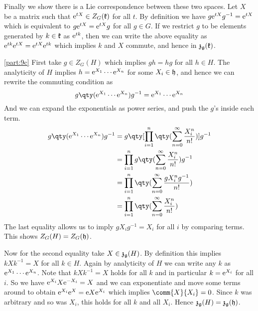 \documentclass[
	pages,
	boxes,
	color=WildStrawberry
]{homework}
\begin{document}
\begin{solution}
	Finally we show there is a Lie correspondence between these two spaces. Let $X$ be a matrix such that $\mathrm{e}^{tX}\in Z_G(\mathfrak{k})$ for all $t$. By definition we have $g\mathrm{e}^{tX}g^{-1} = \mathrm{e}^{tX}$ which is equivalent to $g\mathrm{e}^{tX} = \mathrm{e}^{tX}g$ for all $g\in G$. If we restrict $g$ to be elements generated by $k\in \mathfrak{k}$ as $\mathrm{e}^{tk}$, then we can write the above equality as $\mathrm{e}^{tk}\mathrm{e}^{tX} = \mathrm{e}^{tX}\mathrm{e}^{tk}$ which implies $k$ and $X$ commute, and hence in $\mathfrak{z}_{\mathfrak{g}}(\mathfrak{k})$.

	\ref{part:9c}
	First take $g\in Z_G(H)$ which implies $gh = hg$ for all $h\in H$. The analyticity of $H$ implies $h = \mathrm{e}^{X_1}\cdots \mathrm{e}^{X_n}$ for some $X_i\in\mathfrak{h}$, and hence we can rewrite the commuting condition as
	\begin{equation*}
		g\qty(\e^{X_1}\cdots \e^{X_n})g^{-1} = \e^{X_1}\cdots \e^{X_n}
	\end{equation*}
	And we can expand the exponentials as power series, and push the $g$'s inside each term.
	\begin{align*}
		g\qty(\e^{X_1}\cdots \e^{X_n})g^{-1} & = g\qty[\prod_{i = 1}^n\qty(\sum_{n = 0}^\infty\frac{X_i^n}{n!})]g^{-1} \\
		                                     & = \prod_{i = 1}^n g\qty(\sum_{n = 0}^\infty\frac{X_i^n}{n!})g^{-1}      \\
		                                     & = \prod_{i = 1}^n \qty(\sum_{n = 0}^\infty \frac{g X_i^n g^{-1}}{n!})   \\
		                                     & = \prod_{i = 1}^n \qty(\sum_{n = 0}^\infty \frac{X_i^n}{n!})
	\end{align*}
	The last equality allows us to imply $gX_i g^{-1} = X_i$ for all $i$ by comparing terms. This shows $Z_G(H) = Z_G(\mathfrak{h})$.

	Now for the second equality take $X\in\mathfrak{z}_{\mathfrak{g}}(H)$. By definition this implies $kXk^{-1} = X$ for all $k\in H$. Again by analyticity of $H$ we can write any $k$ as $\mathrm{e}^{X_1}\cdots \mathrm{e}^{X_n}$. Note that $kXk^{-1} = X$ holds for all $k$ and in particular $k = \mathrm{e}^{X_i}$ for all $i$. So we have $\mathrm{e}^{X_i}X\mathrm{e}^{-X_i} = X$ and we can exponentiate and move some terms around to obtain $\mathrm{e}^{X_i}\mathrm{e}^{X} = \mathrm{e}{X}\mathrm{e}^{X_i}$ which implies $\comm{X}{X_i} = 0$. Since $k$ was arbitrary and so was $X_i$, this holds for all $k$ and all $X_i$. Hence $\mathfrak{z}_{\mathfrak{g}}(H) = \mathfrak{z}_{\mathfrak{g}}(\mathfrak{h})$.

\end{solution}
\end{document}
